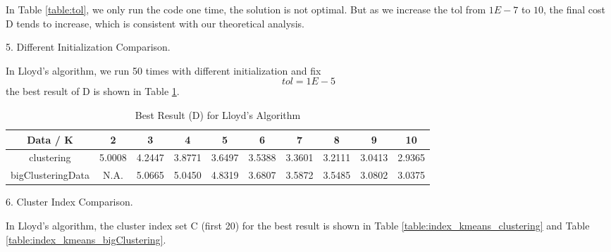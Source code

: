 \begin{description}
\begin{description}
In Table \ref{table:tol}, we only run the code one time, the solution is not optimal. But as we increase the tol from $1E-7$ to $10$, the final cost D tends to increase, which is consistent with our theoretical analysis.\\

\item{5.} Different Initialization Comparison.

In Lloyd's algorithm, we run 50 times with different initialization and fix $$tol = 1E-5$$
the best result of D is shown in Table \ref{table:best_kmeans}.

\begin{table}[H]
	\centering
	\caption{Best Result (D) for Lloyd's Algorithm}
	\label{table:best_kmeans}	
	\begin{tabular}{ c | c | c | c | c | c | c | c | c | c}
		\hline \hline
		Data / K      &  2        &     3    & 4    & 5     & 6    & 7    & 8   & 9    & 10 \\[0.1cm]
		\hline
	clustering	        & 5.0008 & 4.2447 & 3.8771 & 3.6497 & 3.5388 & 3.3601 & 3.2111 & 3.0413 & 2.9365 \\[0.1cm]
bigClusteringData & N.A.    & 5.0665 & 5.0450 & 4.8319 & 3.6807 & 3.5872 & 3.5485 & 3.0802 & 3.0375 \\[0.1cm]
		\hline	
	\end{tabular}
\end{table}

\item{6.} Cluster Index Comparison.

In Lloyd's algorithm, the cluster index set C (first 20) for the best result is shown in Table \ref{table:index_kmeans_clustering} and Table \ref{table:index_kmeans_bigClustering}.


\end{description}
\end{description}
